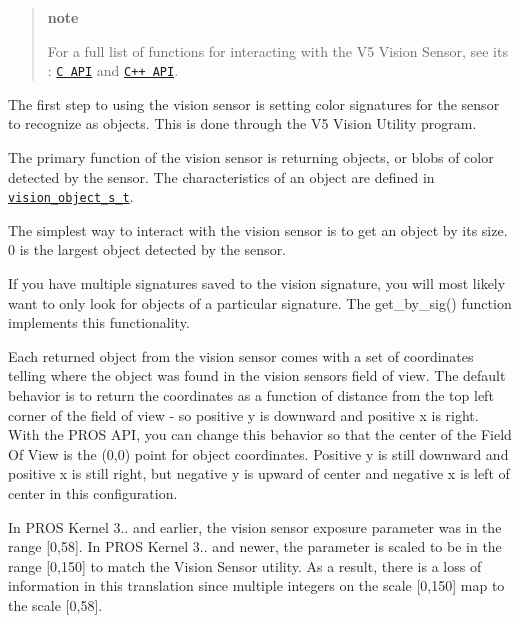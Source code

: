 \begin{quote}
{\bfseries note}

For a full list of functions for interacting with the V5 Vision Sensor, see its \+: \href{../../api/c/vision.html}{\tt C A\+PI} and \href{../../api/cpp/vision.html}{\tt C++ A\+PI}. \end{quote}


The first step to using the vision sensor is setting color signatures for the sensor to recognize as objects. This is done through the V5 Vision Utility program.

The primary function of the vision sensor is returning objects, or blobs of color detected by the sensor. The characteristics of an object are defined in \href{../../api/c/vision.html#vision_object_s_t}{\tt vision\+\_\+object\+\_\+s\+\_\+t}.

The simplest way to interact with the vision sensor is to get an object by its size. 0 is the largest object detected by the sensor.

If you have multiple signatures saved to the vision signature, you will most likely want to only look for objects of a particular signature. The {\ttfamily get\+\_\+by\+\_\+sig()} function implements this functionality.

Each returned object from the vision sensor comes with a set of coordinates telling where the object was found in the vision sensor\textquotesingle{}s field of view. The default behavior is to return the coordinates as a function of distance from the top left corner of the field of view -\/ so positive y is downward and positive x is right. With the P\+R\+OS A\+PI, you can change this behavior so that the center of the Field Of View is the (0,0) point for object coordinates. Positive y is still downward and positive x is still right, but negative y is upward of center and negative x is left of center in this configuration.

In P\+R\+OS Kernel 3.. and earlier, the vision sensor exposure parameter was in the range \mbox{[}0,58\mbox{]}. In P\+R\+OS Kernel 3.. and newer, the parameter is scaled to be in the range \mbox{[}0,150\mbox{]} to match the Vision Sensor utility. As a result, there is a loss of information in this translation since multiple integers on the scale \mbox{[}0,150\mbox{]} map to the scale \mbox{[}0,58\mbox{]}. 